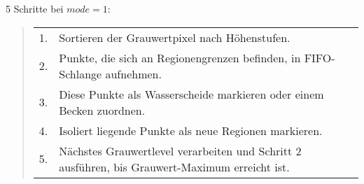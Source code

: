 5 Schritte bei $mode=1$:
\begin{quote}
\begin{tabular}{ll}
1.&     Sortieren der Grauwertpixel nach H\"ohenstufen.\\
2.&     Punkte, die sich an Regionengrenzen befinden, in FIFO-Schlange aufnehmen.\\
3.&     Diese Punkte als Wasserscheide markieren oder einem Becken zuordnen.\\
4.&     Isoliert liegende Punkte als neue Regionen markieren.\\
5.&     N\"achstes Grauwertlevel verarbeiten und Schritt 2 ausf\"uhren, bis Grauwert-Maximum erreicht ist.\\
\end{tabular}
\end{quote}






